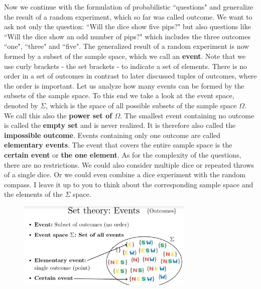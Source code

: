 \documentclass[12pt, a4paper]{scrartcl}
\begin{document}
Now we continue with the formulation of probabilistic ``questions" and generalize the result of a random experiment, which so far was called outcome. We want to ask not only the question: ``Will the dice show five pips?" but also questions like ``Will the dice show an odd number of pips?" which includes the three outcomes ``one", ``three" and ``five".
The generalized result of a random experiment is now formed by a subset of the sample space, which we call an \textbf{event}. Note that we use curly brackets - the set brackets - to indicate a set of elements. There is no order in a set of outcomes in contrast to later discussed tuples of outcomes, where the order is important.
Let us analyze how many events can be formed by the subsets of the sample space. To this end we take a look at the event space, denoted by $\Sigma$, which is the space of all possible subsets of the sample space $\Omega$. We call this also the \textbf{power set of $\Omega$}. 
The smallest event containing no outcome is called the \textbf{empty set} and is never realized. It is therefore also called the \textbf{impossible outcome}.
Events containing only one outcome are called \textbf{elementary events}.
The event that covers the entire sample space is the \textbf{certain event} or \textbf{the one element}. As for the complexity of the questions, there are no restrictions.  We could also consider multiple dice or repeated throws of a single dice. Or we could even combine a dice experiment with the random compass. I leave it up to you to think about the corresponding sample space and the elements of the $\Sigma$ space.\\
\begin{figure}[H]
	\centering
	\includegraphics[width=0.75\textwidth]{WSK_im/1_1.png}
\end{figure}
\\
\end{document}
